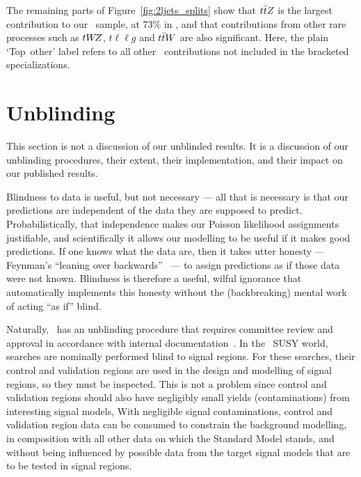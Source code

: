 The remaining parts of Figure~\ref{fig:2ljets_splits} show that $t\bar t Z$ is
the largest contribution to our \topother\ sample,
at $73\%$ in \srllbb, and that contributions from other rare processes such as
$tW\kern-0.4exZ$, $t\ell\ell g$ and $t\bar t W$ are also significant.
Here, the plain `Top~other' label refers to all other \topother\ contributions
not included in the bracketed specializations.


\section{Unblinding}
\label{sec:2ljets_unblinding}
This section is not a discussion of our unblinded results.
It is a discussion of our unblinding procedures,
their extent, their implementation, and their impact on our published results.

Blindness to data is useful, but not necessary ---
all that is necessary is that our predictions are independent of the data
they are supposed to predict.
Probabilistically, that independence makes our Poisson likelihood assignments
justifiable, and scientifically it allows our modelling to be useful if it
makes good predictions.
If one knows what the data are, then it takes utter honesty ---
Feynman's ``leaning over backwards''~\cite{feynman1974cargo} ---
to assign predictions as if those data were not known.
Blindness is therefore a useful, wilful ignorance that automatically implements
this honesty without the (backbreaking) mental work of acting ``as if'' blind.

Naturally, \atlas\ has an unblinding procedure that requires committee
review and approval in accordance with internal
documentation~\cite{usa1944simple}.
In the \atlas\ SUSY world, searches are nominally performed blind to signal
regions.
For these searches, their control and validation regions are used in the
design and modelling of signal regions, so they must be inspected.
This is not a problem since control and validation regions should also
have negligibly small yields (contaminations) from interesting signal models,
With negligible signal contaminations, control and validation region data can
be consumed to constrain the background modelling, in composition with all
other data on which the Standard Model stands, and without being influenced by
possible data from the target signal models that are to be tested in signal
regions.

